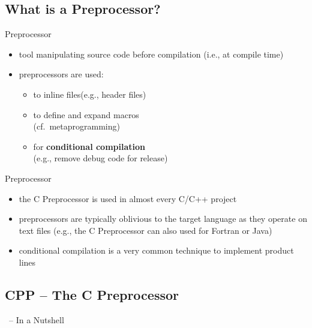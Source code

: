 \subsection{What is a Preprocessor?}
\begin{frame}{\myframetitle{}}
	\begin{mycolumns}
		\begin{definition}{Preprocessor}
			\begin{itemize}
				\item tool manipulating source code before compilation (i.e., at compile time)
				\item preprocessors are used:
					\begin{itemize}
						\item to inline files\hfill(e.g., header files)
						\item to define and expand macros\\\hfill(cf.\ metaprogramming)
						\item for \textbf{conditional compilation}\\\hfill(e.g., remove debug code for release)
					\end{itemize}
			\end{itemize}
		\end{definition}
	\mynextcolumn
		\begin{note}{Preprocessor}
			\begin{itemize}
				\item the C Preprocessor is used in almost every C/C++ project
				\item preprocessors are typically oblivious to the target language as they operate on text files (e.g., the C Preprocessor can also used for Fortran or Java)
				\item conditional compilation is a very common technique to implement product lines
			\end{itemize}
		\end{note}
	\end{mycolumns}
\end{frame}


\subsection{CPP -- The C Preprocessor}
\begin{frame}{\myframetitle\ -- In a Nutshell \mytitlesource{\featureide}}
\end{frame}

